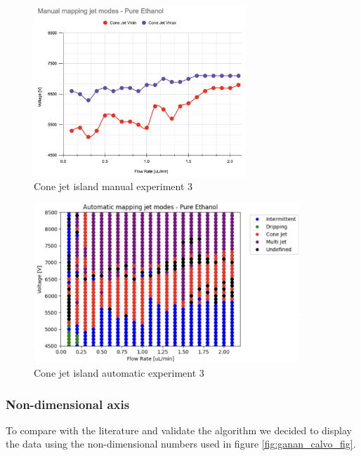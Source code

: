     \begin{multicols}{2}


        \begin{figure}[H]
            \center
            \includegraphics[width=8cm]{Figuras/april/map5.png}
            \caption{Cone jet island manual experiment 3}
            \label{fig:stability_6}
        \end{figure}

        \begin{figure}[H]
            \center
            \includegraphics[width=10cm]{Figuras/april/map2.png}
            \caption{Cone jet island automatic experiment 3}
            \label{fig:stability_7}
        \end{figure}


    \end{multicols}

    \vspace{2cm}
    \subsubsection{Non-dimensional axis}


    To compare with the literature and validate the algorithm we decided to display the data using the non-dimensional numbers used in figure \ref{fig:ganan_calvo_fig}.

